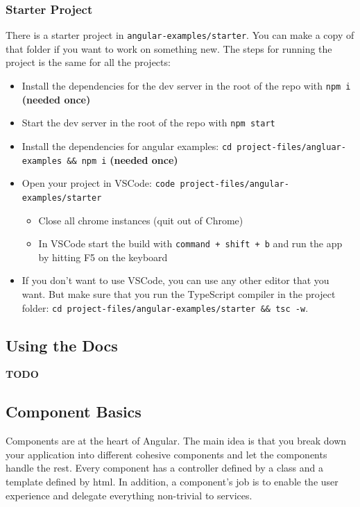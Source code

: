 \documentclass[12pt,]{article}
\providecommand{\tightlist}{%
  \setlength{\itemsep}{0pt}\setlength{\parskip}{0pt}}
\begin{document}
\subsubsection{Starter Project}\label{starter-project}

There is a starter project in \texttt{angular-examples/starter}. You can
make a copy of that folder if you want to work on something new. The
steps for running the project is the same for all the projects:

\begin{itemize}
\tightlist
\item
  Install the dependencies for the dev server in the root of the repo
  with \texttt{npm\ i} \textbf{(needed once)}
\item
  Start the dev server in the root of the repo with \texttt{npm\ start}
\item
  Install the dependencies for angular examples:
  \texttt{cd\ project-files/angluar-examples\ \&\&\ npm\ i}
  \textbf{(needed once)}
\item
  Open your project in VSCode:
  \texttt{code\ project-files/angular-examples/starter}

  \begin{itemize}
  \tightlist
  \item
    Close all chrome instances (quit out of Chrome)
  \item
    In VSCode start the build with \texttt{command\ +\ shift\ +\ b} and
    run the app by hitting F5 on the keyboard
  \end{itemize}
\item
  If you don't want to use VSCode, you can use any other editor that you
  want. But make sure that you run the TypeScript compiler in the
  project folder:
  \texttt{cd\ project-files/angular-examples/starter\ \&\&\ tsc\ -w}.
\end{itemize}

\subsection{Using the Docs}\label{using-the-docs}

\textbf{TODO}

\subsection{Component Basics}\label{component-basics}

Components are at the heart of Angular. The main idea is that you break
down your application into different cohesive components and let the
components handle the rest. Every component has a controller defined by
a class and a template defined by html. In addition, a component's job
is to enable the user experience and delegate everything non-trivial to
services.
\end{document}
